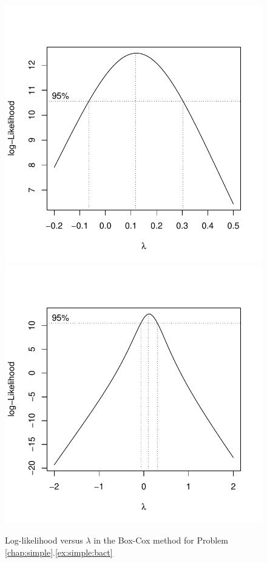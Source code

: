 \begin{solution}{2.22}
\begin{enumerate}
\begin{figure}
\begin{knitrout}
{\centering \includegraphics[width=.45\linewidth]{figure/fig-simple-bact4-1}
\includegraphics[width=.45\linewidth]{figure/fig-simple-bact4-2}

}



\end{knitrout}
\caption{Log-likelihood versus $\lambda$ in the Box-Cox method for Problem \ref{chap:simple}.\ref{ex:simple:bact}} \label{fig:simple:bact4}
\end{figure}


\end{enumerate}
\end{solution}
